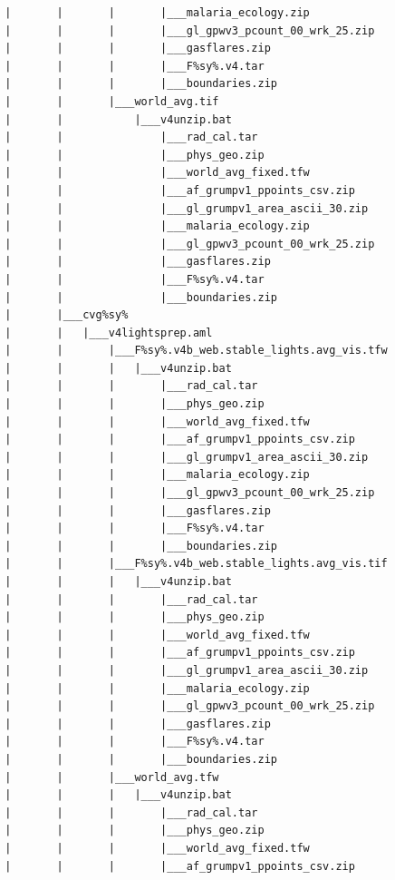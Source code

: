 \documentclass[]{book}
\begin{document}
\begin{verbatim}
        |       |       |       |___malaria_ecology.zip
        |       |       |       |___gl_gpwv3_pcount_00_wrk_25.zip
        |       |       |       |___gasflares.zip
        |       |       |       |___F%sy%.v4.tar
        |       |       |       |___boundaries.zip
        |       |       |___world_avg.tif
        |       |           |___v4unzip.bat
        |       |               |___rad_cal.tar
        |       |               |___phys_geo.zip
        |       |               |___world_avg_fixed.tfw
        |       |               |___af_grumpv1_ppoints_csv.zip
        |       |               |___gl_grumpv1_area_ascii_30.zip
        |       |               |___malaria_ecology.zip
        |       |               |___gl_gpwv3_pcount_00_wrk_25.zip
        |       |               |___gasflares.zip
        |       |               |___F%sy%.v4.tar
        |       |               |___boundaries.zip
        |       |___cvg%sy%
        |       |   |___v4lightsprep.aml
        |       |       |___F%sy%.v4b_web.stable_lights.avg_vis.tfw
        |       |       |   |___v4unzip.bat
        |       |       |       |___rad_cal.tar
        |       |       |       |___phys_geo.zip
        |       |       |       |___world_avg_fixed.tfw
        |       |       |       |___af_grumpv1_ppoints_csv.zip
        |       |       |       |___gl_grumpv1_area_ascii_30.zip
        |       |       |       |___malaria_ecology.zip
        |       |       |       |___gl_gpwv3_pcount_00_wrk_25.zip
        |       |       |       |___gasflares.zip
        |       |       |       |___F%sy%.v4.tar
        |       |       |       |___boundaries.zip
        |       |       |___F%sy%.v4b_web.stable_lights.avg_vis.tif
        |       |       |   |___v4unzip.bat
        |       |       |       |___rad_cal.tar
        |       |       |       |___phys_geo.zip
        |       |       |       |___world_avg_fixed.tfw
        |       |       |       |___af_grumpv1_ppoints_csv.zip
        |       |       |       |___gl_grumpv1_area_ascii_30.zip
        |       |       |       |___malaria_ecology.zip
        |       |       |       |___gl_gpwv3_pcount_00_wrk_25.zip
        |       |       |       |___gasflares.zip
        |       |       |       |___F%sy%.v4.tar
        |       |       |       |___boundaries.zip
        |       |       |___world_avg.tfw
        |       |       |   |___v4unzip.bat
        |       |       |       |___rad_cal.tar
        |       |       |       |___phys_geo.zip
        |       |       |       |___world_avg_fixed.tfw
        |       |       |       |___af_grumpv1_ppoints_csv.zip

\end{verbatim}
\end{document}
